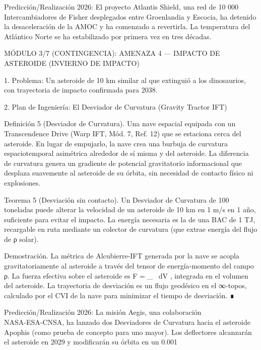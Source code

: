 \documentclass[12pt,a4paper]{book}
\begin{document}
Predicción/Realización 2026: El proyecto Atlantis Shield, una red de 10 000 Intercambiadores de Fisher desplegados entre Groenlandia y Escocia, ha detenido la desaceleración de la AMOC y ha comenzado a revertirla. La temperatura del Atlántico Norte se ha estabilizado por primera vez en tres décadas.

MÓDULO 3/7 (CONTINGENCIA): AMENAZA 4 — IMPACTO DE ASTEROIDE (INVIERNO DE IMPACTO)

1. Problema: Un asteroide de 10 km similar al que extinguió a los dinosaurios, con trayectoria de impacto confirmada para 2038.

2. Plan de Ingeniería: El Desviador de Curvatura (Gravity Tractor IFT)

Definición 5 (Desviador de Curvatura). Una nave espacial equipada con un Transcendence Drive (Warp IFT, Mód. 7, Ref. 12) que se estaciona cerca del asteroide. En lugar de empujarlo, la nave crea una burbuja de curvatura espaciotemporal asimétrica alrededor de sí misma y del asteroide. La diferencia de curvatura genera un gradiente de potencial gravitatorio informacional que desplaza suavemente al asteroide de su órbita, sin necesidad de contacto físico ni explosiones.

Teorema 5 (Desviación sin contacto). Un Desviador de Curvatura de 100 toneladas puede alterar la velocidad de un asteroide de 10 km en 1 m/s en 1 año, suficiente para evitar el impacto. La energía necesaria es la de una BAC de 1 TJ, recargable en ruta mediante un colector de curvatura (que extrae energía del flujo de ρ solar).

Demostración. La métrica de Alcubierre‑IFT generada por la nave se acopla gravitatoriamente al asteroide a través del tensor de energía‑momento del campo ρ. La fuerza efectiva sobre el asteroide es  F = \int \nabla \rho_{} \, dV , integrada en el volumen del asteroide. La trayectoria de desviación es un flujo geodésico en el ∞‑topos, calculado por el CVI de la nave para minimizar el tiempo de desviación. ∎

Predicción/Realización 2026: La misión Aegis, una colaboración NASA‑ESA‑CNSA, ha lanzado dos Desviadores de Curvatura hacia el asteroide Apophis (como prueba de concepto para uno mayor). Los deflectores alcanzarán el asteroide en 2029 y modificarán su órbita en un 0.001%
\end{document}
